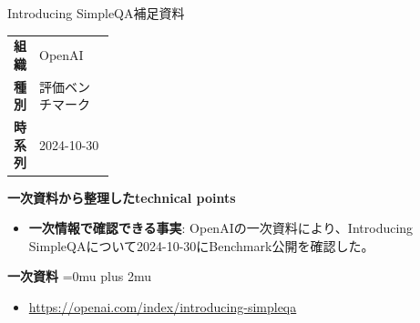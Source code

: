 \begin{technicalnote}{Introducing SimpleQA}{補足資料}
\begingroup
\begin{tabularx}{\linewidth}{@{}>{\bfseries}p{0.22\linewidth}X@{}}
組織 & OpenAI \\
種別 & 評価ベンチマーク \\
時系列 & 2024-10-30 \\
\end{tabularx}
\smallskip
{\bfseries 一次資料から整理したtechnical points}
\begin{itemize}[leftmargin=1.5em,itemsep=0.35em]
\item \textbf{一次情報で確認できる事実}: OpenAIの一次資料により、Introducing SimpleQAについて2024-10-30にBenchmark公開を確認した。
\end{itemize}
\begin{minipage}{\linewidth}
\begin{samepage}
{\bfseries 一次資料}
\begingroup\sloppy
\Urlmuskip=0mu plus 2mu\relax
\begin{itemize}[leftmargin=1.5em,itemsep=0.25em]
\item {\scriptsize\url{https://openai.com/index/introducing-simpleqa}}
\end{itemize}
\endgroup
\end{samepage}
\end{minipage}
\endgroup
\end{technicalnote}
\medskip
